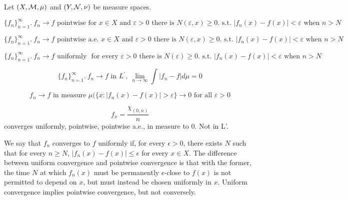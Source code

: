 %


\begin{dfn}[Rectangle]
Let $(X,{\mathcal M}, \mu)$ and $(Y, {\mathcal N}, \nu)$ be measure spaces. 

\end{dfn}

\begin{dfn}[1]
\[\{f_n\}_{n=1}^\infty. \ f_n \rightarrow f \text{ pointwise for } x \in X \text{ and } \varepsilon>0 \text{ there is } N(\varepsilon, x) \geq 0. \text{ s.t. } |f_n(x)-f(x)|< \varepsilon \text{ when } n>N
\]	
\end{dfn}

\begin{dfn}[2]
	\[\{f_n\}_{n=1}^\infty. \ f_n \rightarrow f \text{ pointwise a.e. } x \in X \text{ and } \varepsilon>0 \text{ there is } N(\varepsilon, x) \geq 0. \text{ s.t. } |f_n(x)-f(x)|< \varepsilon \text{ when } n>N
	\]
\end{dfn}

\begin{dfn}[3]
	\[\{f_n\}_{n=1}^\infty. \ f_n \rightarrow f \text{  uniformly } \text{ for every } \varepsilon>0 \text{ there is } N(\varepsilon) \geq 0. \text{ s.t. } |f_n(x)-f(x)|< \varepsilon \text{ when } n>N
	\]
\end{dfn}

\begin{dfn}[4]
	\[\{f_n\}_{n=1}^\infty. \ f_n \rightarrow f \text{ in } L^{'}, \ \lim_{n \rightarrow \infty}\int |f_n - f|d \mu=0 \]
\end{dfn}
\begin{dfn}[5]
\[f_n \rightarrow f \text{ in measure } \mu(\{ x: |f_n(x)-f(x)|>\varepsilon  \}\rightarrow 0 \text{ for all } \varepsilon>0
\]	
\end{dfn}
\begin{example}
\[f_x=\frac{\chi_{(0,n)}}{n}\] converges uniformly, pointwise, pointwise a.e., in measure to 0. Not in L'.
\end{example}

\begin{dfn}
We say that $f_n$ converges to $f$ uniformly if, for every ${\epsilon > 0}$, there exists ${N}$ such that for every ${n \geq N}$, ${|f_n(x) - f(x)| \leq \epsilon}$ for every ${x \in X}$. The difference between uniform convergence and pointwise convergence is that with the former, the time ${N}$ at which ${f_n(x)} $ must be permanently ${\epsilon}$-close to ${f(x)}$ is not permitted to depend on ${x}$, but must instead be chosen uniformly in ${x}$.
Uniform convergence implies pointwise convergence, but not conversely.	
\end{dfn}


